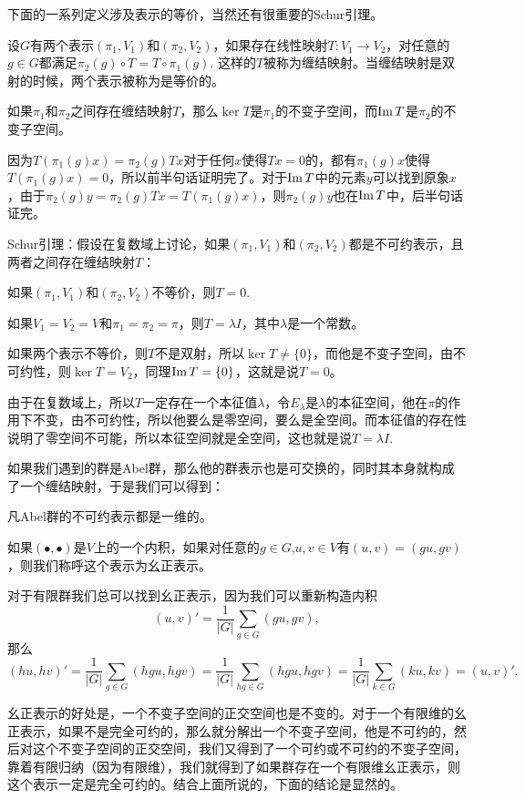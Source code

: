 下面的一系列定义涉及表示的等价，当然还有很重要的Schur引理。

\para 设$G$有两个表示$(\pi_1,V_1)$和$(\pi_2,V_2)$，如果存在线性映射$T:V_1\to V_2$，对任意的$g\in G$都满足$\pi_2(g)\circ T=T\circ \pi_1(g)$. 这样的$T$被称为缠结映射。当缠结映射是双射的时候，两个表示被称为是等价的。

\para 如果$\pi_1$和$\pi_2$之间存在缠结映射$T$，那么$\ker T$是$\pi_1$的不变子空间，而$\operatorname{Im} T$是$\pi_2$的不变子空间。

因为$T(\pi_1(g)x)=\pi_2(g)Tx$对于任何$x$使得$Tx=0$的，都有$\pi_1(g)x$使得$T(\pi_1(g)x)=0$，所以前半句话证明完了。对于$\operatorname{Im} T$中的元素$y$可以找到原象$x$，由于$\pi_2(g)y=\pi_2(g)Tx=T(\pi_1(g)x)$，则$\pi_2(g)y$也在$\operatorname{Im} T$中，后半句话证完。

\begin{theo}
Schur引理：假设在复数域上讨论，如果$(\pi_1,V_1)$和$(\pi_2,V_2)$都是不可约表示，且两者之间存在缠结映射$T$：

 如果$(\pi_1,V_1)$和$(\pi_2,V_2)$不等价，则$T=0$.

 如果$V_1=V_2=V$和$\pi_1=\pi_2=\pi$，则$T=\lambda I$，其中$\lambda$是一个常数。
\end{theo}

如果两个表示不等价，则$T$不是双射，所以$\ker T\neq \{0\}$，而他是不变子空间，由不可约性，则$\ker T= V_2$，同理$\operatorname{Im}  T= \{0\}$，这就是说$T=0$。

由于在复数域上，所以$T$一定存在一个本征值$\lambda$，令$E_\lambda$是$\lambda$的本征空间，他在$\pi$的作用下不变，由不可约性，所以他要么是零空间，要么是全空间。而本征值的存在性说明了零空间不可能，所以本征空间就是全空间，这也就是说$T=\lambda I$.

如果我们遇到的群是Abel群，那么他的群表示也是可交换的，同时其本身就构成了一个缠结映射，于是我们可以得到：

\pro 凡Abel群的不可约表示都是一维的。

如果$(\bullet,\bullet)$是$V$上的一个内积，如果对任意的$g\in G$,$u,v\in V$有$(u,v)=(gu,gv)$，则我们称呼这个表示为幺正表示。

对于有限群我们总可以找到幺正表示，因为我们可以重新构造内积
\[
(u,v)'=\frac{1}{|G|}\sum_{g\in G}(gu,gv),
\]
那么
\[
(hu,hv)'=\frac{1}{|G|}\sum_{g\in G}(hgu,hgv)=\frac{1}{|G|}\sum_{hg\in G}(hgu,hgv)=\frac{1}{|G|}\sum_{k\in G}(ku,kv)=(u,v)'.
\]

幺正表示的好处是，一个不变子空间的正交空间也是不变的。对于一个有限维的幺正表示，如果不是完全可约的，那么就分解出一个不变子空间，他是不可约的，然后对这个不变子空间的正交空间，我们又得到了一个可约或不可约的不变子空间，靠着有限归纳（因为有限维），我们就得到了如果群存在一个有限维幺正表示，则这个表示一定是完全可约的。结合上面所说的，下面的结论是显然的。

